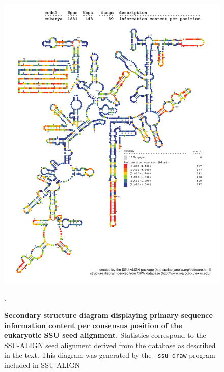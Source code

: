 \begin{figure}
\begin{center}
\includegraphics[width=5.7in]{Figures/eukarya-0p1-info}
\end{center}
\caption[Secondary structure diagram displaying primary sequence
  information content per consensus position of the eukaryotic SSU seed
  alignment]{\textbf{Secondary structure diagram displaying primary
  sequence information content per consensus position of the eukaryotic SSU seed
  alignment.} Statistics correspond to the SSU-ALIGN seed
  alignment derived from the  database \cite{CannoneGutell02}
  as described in the text. This diagram was generated by the {\tt
  ssu-draw} program included in SSU-ALIGN}.
\label{fig:eukinfo}
\end{figure}

\newpage 

